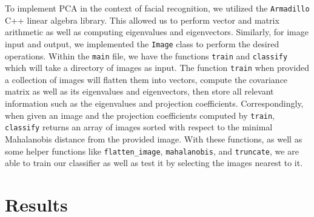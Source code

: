 \documentclass[ 12pt ]{article}
\begin{document}
\qquad To implement PCA in the context of facial recognition, we utilized the \verb|Armadillo| C++ linear algebra library. This allowed us to perform vector and matrix arithmetic as well as
computing eigenvalues and eigenvectors. Similarly, for image input and output, we implemented the \verb|Image| class to perform the desired operations. Within the \verb|main| file, we
have the functions \verb|train| and \verb|classify| which will take a directory of images as input. The function \verb|train| when provided a collection of images will flatten them into
vectors, compute the covariance matrix as well as its eigenvalues and eigenvectors, then store all relevant information such as the eigenvalues and projection coefficients.
Correspondingly, when given an image and the projection coefficients computed by \verb|train|, \verb|classify| returns an array of images sorted with respect to the minimal Mahalanobis
distance from the provided image. With these functions, as well as some helper functions like \verb|flatten_image|, \verb|mahalanobis|, and \verb|truncate|, we are able to train our
classifier as well as test it by selecting the images nearest to it.


\section*{Results}
\end{document}
